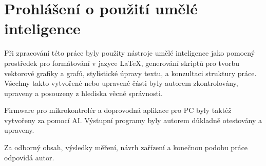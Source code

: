 \chapter*{Prohlášení o použití umělé inteligence}
{}

Při zpracování této práce byly použity nástroje umělé inteligence jako pomocný prostředek pro formátování v jazyce LaTeX, generování skriptů pro tvorbu vektorové grafiky a grafů, stylistické úpravy textu, a konzultaci struktury práce. 
Všechny takto vytvořené nebo upravené části byly autorem zkontrolovány, upraveny a posouzeny z hlediska věcné správnosti.

Firmware pro mikrokontrolér a doprovodná aplikace pro PC byly taktéž vytvořeny za pomocí AI. Výstupní programy byly autorem důkladně otestovány a upraveny.

Za odborný obsah, výsledky měření, návrh zařízení a konečnou podobu práce odpovídá autor.
